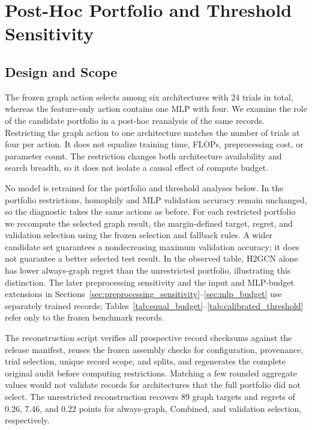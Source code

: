 \section{Post-Hoc Portfolio and Threshold Sensitivity}
\label{sec:equal_budget}

\subsection{Design and Scope}

The frozen graph action selects among six architectures with 24 trials in total, whereas the feature-only action contains one MLP with four. We examine the role of the candidate portfolio in a post-hoc reanalysis of the same records. Restricting the graph action to one architecture matches the number of trials at four per action. It does not equalize training time, FLOPs, preprocessing cost, or parameter count. The restriction changes both architecture availability and search breadth, so it does not isolate a causal effect of compute budget.

No model is retrained for the portfolio and threshold analyses below. In the portfolio restrictions, homophily and MLP validation accuracy remain unchanged, so the diagnostic takes the same actions as before. For each restricted portfolio we recompute the selected graph result, the margin-defined target, regret, and validation selection using the frozen selection and fallback rules. A wider candidate set guarantees a nondecreasing maximum validation accuracy; it does not guarantee a better selected test result. In the observed table, H2GCN alone has lower always-graph regret than the unrestricted portfolio, illustrating this distinction. The later preprocessing sensitivity and the input and MLP-budget extensions in Sections~\ref{sec:preprocessing_sensitivity}--\ref{sec:mlp_budget} use separately trained records; Tables~\ref{tab:equal_budget}--\ref{tab:calibrated_threshold} refer only to the frozen benchmark records.

The reconstruction script verifies all prospective record checksums against the release manifest, reuses the frozen assembly checks for configuration, provenance, trial selection, unique record scope, and splits, and regenerates the complete original audit before computing restrictions. Matching a few rounded aggregate values would not validate records for architectures that the full portfolio did not select. The unrestricted reconstruction recovers 89 graph targets and regrets of 0.26, 7.46, and 0.22 points for always-graph, Combined, and validation selection, respectively.

